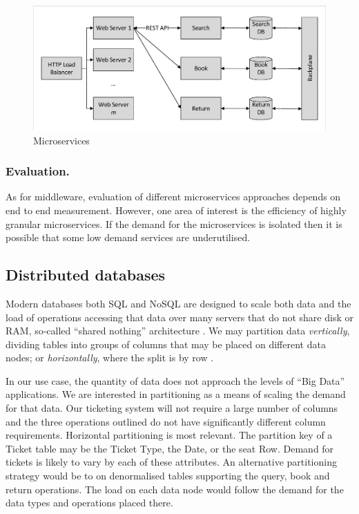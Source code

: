 \begin{figure}
\caption{Microservices}
\centering
\includegraphics[trim = 5 5 5 5, clip, width=\textwidth]{img/microservices}
\end{figure}

\subsubsection{Evaluation.}
As for middleware, evaluation of different microservices approaches depends on end to end measurement.   However, one area of interest is the efficiency of highly granular microservices.  If the demand for the microservices is isolated then it is possible that some low demand services are underutilised.

%
%

\subsection{Distributed databases}
Modern databases both SQL and NoSQL are designed to scale both data and the load of operations accessing that data over many servers that do not share disk or RAM, so-called ``shared nothing'' architecture \cite{cattell2011scalable}.  We may partition data {\itshape vertically}, dividing tables into groups of columns that may be placed on different data nodes; or {\itshape horizontally}, where the split is by row \cite{agrawal2004integrating}. 

In our use case, the quantity of data does not approach the levels of ``Big Data'' applications.  We are interested in partitioning as a means of scaling the demand for that data.  Our ticketing system will not require a large number of columns and the three operations outlined do not have significantly different column requirements.  Horizontal partitioning is most relevant.  The partition key of a Ticket table may be the Ticket Type, the Date, or the seat Row.  Demand for tickets is likely to vary by each of these attributes.  An alternative partitioning strategy would be to on denormalised tables supporting the query, book and return operations.  The load on each data node would follow the demand for the data types and operations placed there.

